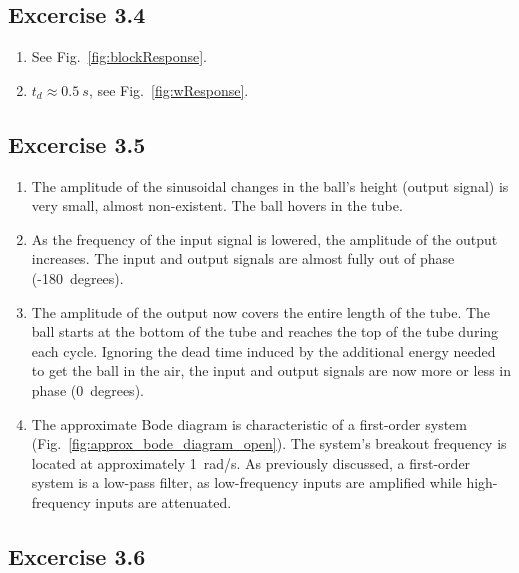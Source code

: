 \documentclass[10pt,twoside,openright]{article}
\begin{document}
\subsection*{Excercise 3.4}

\begin{enumerate}
\setlength\itemsep{0em}
	\item See Fig.~\ref{fig:blockResponse}.
	\item $t_d \approx 0.5~s$, see Fig.~\ref{fig:wResponse}.
\end{enumerate}

\subsection*{Excercise 3.5}

\begin{enumerate}
\setlength\itemsep{0em}
\item The amplitude of the sinusoidal changes in the ball's height (output signal) is very small, almost non-existent. The ball hovers in the tube.
\item As the frequency of the input signal is lowered, the amplitude of the output increases. The input and output signals are almost fully out of phase (-180~degrees).
\item The amplitude of the output now covers the entire length of the tube. The ball starts at the bottom of the tube and reaches the top of the tube during each cycle. Ignoring the dead time induced by the additional energy needed to get the ball in the air, the input and output signals are now more or less in phase (0~degrees).
\item The approximate Bode diagram is characteristic of a first-order system (Fig.~\ref{fig:approx_bode_diagram_open}). The system's breakout frequency is located at approximately 1~rad/s. As previously discussed, a first-order system is a low-pass filter, as low-frequency inputs are amplified while high-frequency inputs are attenuated. 
\end{enumerate}

\subsection*{Excercise 3.6}
\end{document}
